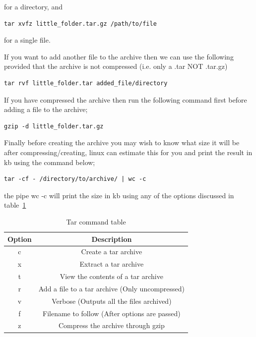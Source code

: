 for a directory, and

\begin{lstlisting}
tar xvfz little_folder.tar.gz /path/to/file
\end{lstlisting}

for a single file.

If you want to add another file to the archive then we can use the following provided that the archive is not compressed (i.e. only a .tar NOT .tar.gz)

\begin{lstlisting}
tar rvf little_folder.tar added_file/directory
\end{lstlisting}

If you have compressed the archive then run the following command first before adding a file to the archive;

\begin{lstlisting}
gzip -d little_folder.tar.gz
\end{lstlisting}

Finally before creating the archive you may wish to know what size it will be after compressing/creating, linux can estimate this for you and print the result in kb using the command below;

\begin{lstlisting}
tar -cf - /directory/to/archive/ | wc -c
\end{lstlisting}

the pipe wc -c will print the size in kb using any of the options discussed in table~\ref{tab:tar}

\begin{table}[!th]
\centering
\begin{tabular}{cc}
\hline
Option & Description\\
\hline
c & Create a tar archive\\
x & Extract a tar archive\\
t & View the contents of a tar archive\\
r & Add a file to a tar archive (Only uncompressed)\\
\hline
v & Verbose (Outputs all the files archived)\\
f & Filename to follow (After options are passed)\\
z & Compress the archive through gzip\\
\hline
\end{tabular}
\caption{Tar command table}
\label{tab:tar}
\end{table}


